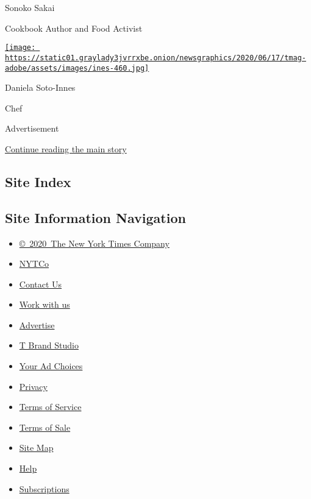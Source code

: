 Sonoko Sakai

Cookbook Author and Food Activist

\href{https://www.nytimes3xbfgragh.onion/2020/08/10/t-magazine/daniela-soto-innes-cooking-chef.html}{\texttt{[image: https://static01.graylady3jvrrxbe.onion/newsgraphics/2020/06/17/tmag-adobe/assets/images/ines-460.jpg]}}

Daniela Soto-Innes

Chef

Advertisement

\protect\hyperlink{after-bottom}{Continue reading the main story}

\hypertarget{site-index}{%
\subsection{Site Index}\label{site-index}}

\hypertarget{site-information-navigation}{%
\subsection{Site Information
Navigation}\label{site-information-navigation}}

\begin{itemize}
\tightlist
\item
  \href{https://help.nytimes3xbfgragh.onion/hc/en-us/articles/115014792127-Copyright-notice}{©~2020~The
  New York Times Company}
\end{itemize}

\begin{itemize}
\tightlist
\item
  \href{https://www.nytco.com/}{NYTCo}
\item
  \href{https://help.nytimes3xbfgragh.onion/hc/en-us/articles/115015385887-Contact-Us}{Contact
  Us}
\item
  \href{https://www.nytco.com/careers/}{Work with us}
\item
  \href{https://nytmediakit.com/}{Advertise}
\item
  \href{http://www.tbrandstudio.com/}{T Brand Studio}
\item
  \href{https://www.nytimes3xbfgragh.onion/privacy/cookie-policy\#how-do-i-manage-trackers}{Your
  Ad Choices}
\item
  \href{https://www.nytimes3xbfgragh.onion/privacy}{Privacy}
\item
  \href{https://help.nytimes3xbfgragh.onion/hc/en-us/articles/115014893428-Terms-of-service}{Terms
  of Service}
\item
  \href{https://help.nytimes3xbfgragh.onion/hc/en-us/articles/115014893968-Terms-of-sale}{Terms
  of Sale}
\item
  \href{https://spiderbites.nytimes3xbfgragh.onion}{Site Map}
\item
  \href{https://help.nytimes3xbfgragh.onion/hc/en-us}{Help}
\item
  \href{https://www.nytimes3xbfgragh.onion/subscription?campaignId=37WXW}{Subscriptions}
\end{itemize}
